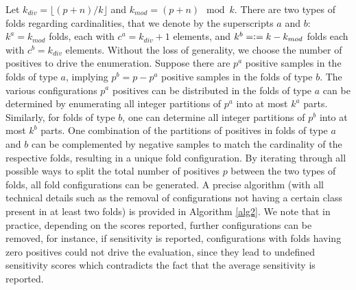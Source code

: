 \documentclass[5p, final]{elsarticle}
\newcommand{\defeq}{\vcentcolon=}
\begin{document}
Let $k_{div} = \lfloor (p + n) / k \rfloor$ and $k_{mod} = (p + n) \mod k$. There are two types of folds regarding cardinalities, that we denote by the superscripts $a$ and $b$: $k^a = k_{mod}$ folds, each with $c^{a} = k_{div} + 1$ elements, and $k^b = \defeq k - k_{mod}$ folds each with $c^b = k_{div}$ elements. Without the loss of generality, we choose the number of positives to drive the enumeration. Suppose there are $p^a$ positive samples in the folds of type $a$, implying $p^b = p - p^a$ positive samples in the folds of type $b$. The various configurations $p^a$ positives can be distributed in the folds of type $a$ can be determined by enumerating all integer partitions of $p^a$ into at most $k^a$ parts. Similarly, for folds of type $b$, one can determine all integer partitions of $p^b$ into at most $k^b$ parts. One combination of the partitions of positives in folds of type $a$ and $b$ can be complemented by negative samples to match the cardinality of the respective folds, resulting in a unique fold configuration. By iterating through all possible ways to split the total number of positives $p$ between the two types of folds, all fold configurations can be generated. A precise algorithm (with all technical details such as the removal of configurations not having a certain class present in at least two folds) is provided in Algorithm \ref{alg2}. We note that in practice, depending on the scores reported, further configurations can be removed, for instance, if sensitivity is reported, configurations with folds having zero positives could not drive the evaluation, since they lead to undefined sensitivity scores which contradicts the fact that the average sensitivity is reported.
\end{document}
